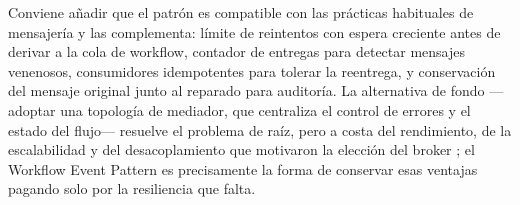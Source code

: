 Conviene añadir que el patrón es compatible con las prácticas habituales de mensajería y las complementa: límite de reintentos con espera creciente antes de derivar a la cola de workflow, contador de entregas para detectar mensajes venenosos, consumidores idempotentes para tolerar la reentrega, y conservación del mensaje original junto al reparado para auditoría. La alternativa de fondo ---adoptar una topología de mediador, que centraliza el control de errores y el estado del flujo--- resuelve el problema de raíz, pero a costa del rendimiento, de la escalabilidad y del desacoplamiento que motivaron la elección del broker \parencite{richardsford2020}; el Workflow Event Pattern es precisamente la forma de conservar esas ventajas pagando solo por la resiliencia que falta.
